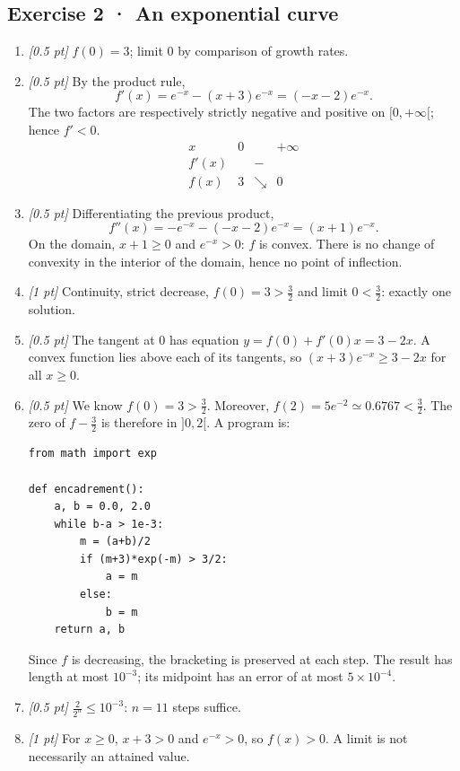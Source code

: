\subsection*{Exercise 2 · An exponential curve}\begin{enumerate}

\item \textit{[0.5 pt]} $f(0)=3$; limit $0$ by comparison of growth rates.

\item \textit{[0.5 pt]} By the product rule,
\[f'(x)=e^{-x}-(x+3)e^{-x}=(-x-2)e^{-x}.\]
The two factors are respectively strictly negative and positive on $[0,+\infty[$; hence $f'<0$.
\[\begin{array}{c|ccc}x&0&&+\infty\\\hline f'(x)&&-&\\\hline f(x)&3&\searrow&0\end{array}\]

\item \textit{[0.5 pt]} Differentiating the previous product,
\[f''(x)=-e^{-x}-(-x-2)e^{-x}=(x+1)e^{-x}.\]
On the domain, $x+1\ge0$ and $e^{-x}>0$: $f$ is convex. There is no change of convexity in the interior of the domain, hence no point of inflection.

\item \textit{[1 pt]} Continuity, strict decrease, $f(0)=3>\frac{3}{2}$ and limit $0<\frac{3}{2}$: exactly one solution.

\item \textit{[0.5 pt]} The tangent at $0$ has equation $y=f(0)+f'(0)x=3-2x$. A convex function lies above each of its tangents, so $(x+3)e^{-x}\ge 3-2x$ for all $x\ge0$.


\item \textit{[0.5 pt]} We know $f(0)=3>\frac{3}{2}$. Moreover, $f(2)=5e^{-2}\simeq\num{0,6767}<\frac{3}{2}$. The zero of $f-\frac{3}{2}$ is therefore in $]0,2[$. A program is:
\begin{lstlisting}
from math import exp

def encadrement():
    a, b = 0.0, 2.0
    while b-a > 1e-3:
        m = (a+b)/2
        if (m+3)*exp(-m) > 3/2:
            a = m
        else:
            b = m
    return a, b
\end{lstlisting}
Since $f$ is decreasing, the bracketing is preserved at each step. The result has length at most $10^{-3}$; its midpoint has an error of at most $5\times10^{-4}$.

\item \textit{[0.5 pt]} $\frac{2}{2^n}\le10^{-3}$: $n=11$ steps suffice.

\item \textit{[1 pt]} For $x\ge0$, $x+3>0$ and $e^{-x}>0$, so $f(x)>0$. A limit is not necessarily an attained value.

\end{enumerate}

